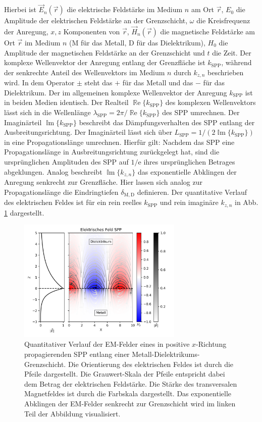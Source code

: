 \documentclass[a4paper, titlepage,  ngerman, fullpage]{book}
\renewcommand{\Re}{\operatorname{\mathbb{R}e}}
\renewcommand{\Im}{\operatorname{\mathbb{I}m}}
\begin{document}
	Hierbei ist $\vec{E}_n(\vec{r})$ die elektrische Feldstärke im Medium $n$ am Ort $\vec{r}$, $E_0$ die Amplitude der elektrischen Feldstärke an der Grenzschicht, $\omega$ die Kreisfrequenz der Anregung, $x, z$ Komponenten von $\vec{r}$, $\vec{H}_n(\vec{r})$ die magnetische Feldstärke am Ort $\vec{r}$ im Medium $n$ ($\mathrm{M}$ für das Metall, $\mathrm{D}$ für das Dielektrikum), $H_0$ die Amplitude der magnetischen Feldstärke an der Grenzschicht und $t$ die Zeit. Der komplexe Wellenvektor der Anregung entlang der Grenzfläche ist $k_{\mathrm{SPP}}$, während der senkrechte Anteil des Wellenvektors im Medium $n$ durch $k_{z,n}$ beschrieben wird.
	In dem Operator $\pm$ steht das $+$ für das Metall und das $-$ für das Dielektrikum. Der im allgemeinen komplexe Wellenvektor der Anregung $k_{\mathrm{SPP}}$ ist in beiden Medien identisch. Der Realteil $\Re\{k_{\mathrm{SPP}}\}$ des komplexen Wellenvektors lässt sich in die Wellenlänge $\lambda_{\mathrm{SPP}} = 2\pi/ \Re\{k_{\mathrm{SPP}}\} $ des SPP umrechnen. Der Imaginärteil $\Im\{k_{\mathrm{SPP}}\}$ beschreibt das Dämpfungsverhalten des SPP entlang der Ausbreitungsrichtung. Der Imaginärteil lässt sich über $L_{\mathrm{SPP}} = 1/(2\Im\{k_{\mathrm{SPP}}\})$ in eine Propagationslänge umrechnen.  Hierfür gilt: Nachdem das SPP eine Propagationslänge in Ausbreitungsrichtung zurückgelegt hat, sind die ursprünglichen Amplituden des SPP auf $1/\mathrm{e}$ ihres ursprünglichen Betrages abgeklungen. Analog beschreibt $\Im\{k_{z, n}\}$ das exponentielle Abklingen der Anregung senkrecht zur Grenzfläche. Hier lassen sich analog zur Propagationslänge die Eindringtiefen $\delta_{\mathrm{M,D}}$ definieren. Der quantitative Verlauf des elektrischen Feldes ist für ein rein reelles $k_{\mathrm{SPP}}$ und rein imaginäre $k_{z, n}$ in Abb. \ref{fig:electric_field_spp} dargestellt. 
	\begin{figure} 
		\centering
		\includegraphics[width=0.7\textwidth]{figures/E_Feld_SPP.png}
		\caption[Feldorientierung SPP]{Quantitativer Verlauf der EM-Felder eines in positive $x$-Richtung propagierenden SPP entlang einer Metall-Dielektrikums-Grenzschicht. Die Orientierung des elektrischen Feldes ist durch die Pfeile dargestellt. Die Grauwert-Skala der Pfeile entspricht dabei dem Betrag der elektrischen Feldstärke. Die Stärke des transversalen Magnetfeldes ist durch die Farbskala dargestellt. Das exponentielle Abklingen der EM-Felder senkrecht zur Grenzschicht wird im linken Teil der Abbildung visualisiert.}
		\label{fig:electric_field_spp}
	\end{figure}
	
\end{document}
